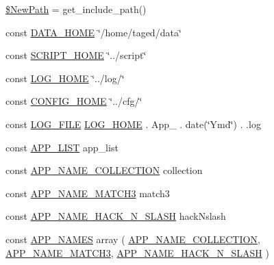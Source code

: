 \begin{DoxyCompactItemize}
\item 
\hyperlink{application_2src_2define_8php_ab799dd8b8bb69da796893f995964508b}{\$\+New\+Path} = get\+\_\+include\+\_\+path()
\item 
const \hyperlink{application_2src_2define_8php_abd49961c9bba0d5462ea18f49f2e854b}{D\+A\+T\+A\+\_\+\+H\+O\+ME} \char`\"{}/home/taged/data\char`\"{}
\item 
const \hyperlink{application_2src_2define_8php_a9804a4355514926fe48d229604f4c134}{S\+C\+R\+I\+P\+T\+\_\+\+H\+O\+ME} \char`\"{}../script\char`\"{}
\item 
const \hyperlink{application_2src_2define_8php_a116320c7210ee531a52287c793dbb6bd}{L\+O\+G\+\_\+\+H\+O\+ME} \char`\"{}../log/\char`\"{}
\item 
const \hyperlink{application_2src_2define_8php_aa32003175807358a35405b1e01132669}{C\+O\+N\+F\+I\+G\+\_\+\+H\+O\+ME} \char`\"{}../cfg/\char`\"{}
\item 
const \hyperlink{application_2src_2define_8php_a02721dac9f58aa1c07505d20838d9930}{L\+O\+G\+\_\+\+F\+I\+LE} \hyperlink{application_2src_2define_8php_a116320c7210ee531a52287c793dbb6bd}{L\+O\+G\+\_\+\+H\+O\+ME} . \textquotesingle{}App\+\_\+\textquotesingle{} . date(\char`\"{}Ymd\char`\"{}) . \textquotesingle{}.log\textquotesingle{}
\item 
const \hyperlink{application_2src_2define_8php_af04404fa9a3ef5f65b765c15166a2ed1}{A\+P\+P\+\_\+\+L\+I\+ST} \textquotesingle{}app\+\_\+list\textquotesingle{}
\item 
const \hyperlink{application_2src_2define_8php_a31f941544cc2bc0be58b14635dd94068}{A\+P\+P\+\_\+\+N\+A\+M\+E\+\_\+\+C\+O\+L\+L\+E\+C\+T\+I\+ON} \textquotesingle{}collection\textquotesingle{}
\item 
const \hyperlink{application_2src_2define_8php_ab846d713e68b6f55576177371ac36563}{A\+P\+P\+\_\+\+N\+A\+M\+E\+\_\+\+M\+A\+T\+C\+H3} \textquotesingle{}match3\textquotesingle{}
\item 
const \hyperlink{application_2src_2define_8php_aafbb283144936400f27f3234053d0d8d}{A\+P\+P\+\_\+\+N\+A\+M\+E\+\_\+\+H\+A\+C\+K\+\_\+\+N\+\_\+\+S\+L\+A\+SH} \textquotesingle{}hack\+Nslash\textquotesingle{}
\item 
const \hyperlink{application_2src_2define_8php_a27c7276487a22ff681a91affaab155f9}{A\+P\+P\+\_\+\+N\+A\+M\+ES} array ( \hyperlink{application_2src_2define_8php_a31f941544cc2bc0be58b14635dd94068}{A\+P\+P\+\_\+\+N\+A\+M\+E\+\_\+\+C\+O\+L\+L\+E\+C\+T\+I\+ON}, \hyperlink{application_2src_2define_8php_ab846d713e68b6f55576177371ac36563}{A\+P\+P\+\_\+\+N\+A\+M\+E\+\_\+\+M\+A\+T\+C\+H3}, \hyperlink{application_2src_2define_8php_aafbb283144936400f27f3234053d0d8d}{A\+P\+P\+\_\+\+N\+A\+M\+E\+\_\+\+H\+A\+C\+K\+\_\+\+N\+\_\+\+S\+L\+A\+SH} )

\end{DoxyCompactItemize}
